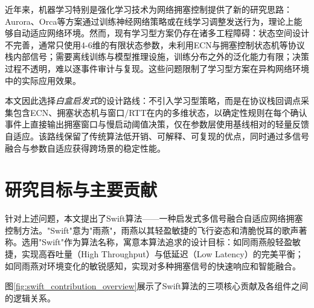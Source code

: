 近年来，机器学习特别是强化学习技术为网络拥塞控制提供了新的研究思路：Aurora、Orca等方案通过训练神经网络策略或在线学习调整发送行为，理论上能够自动适应网络环境。然而，现有学习型方案仍存在诸多工程障碍：状态空间设计不完善，通常只使用4-6维的有限状态参数，未利用ECN与拥塞控制状态机等协议栈内部信号；需要离线训练与模型推理设施，训练分布之外的泛化能力有限；决策过程不透明，难以逐事件审计与复现。这些问题限制了学习型方案在异构网络环境中的实际应用效果。

本文因此选择\emph{白盒启发式}的设计路线：不引入学习型策略，而是在协议栈回调点采集包含ECN、拥塞状态机与窗口/RTT在内的多维状态，以确定性规则在每个确认事件上直接输出拥塞窗口与慢启动阈值决策，仅在参数层使用基线相对的轻量反馈自适应。该路线保留了传统算法低开销、可解释、可复现的优点，同时通过多信号融合与参数自适应获得跨场景的稳定性能。

\section{研究目标与主要贡献}

针对上述问题，本文提出了Swift算法——一种启发式多信号融合自适应网络拥塞控制方法。"Swift"意为"雨燕"，雨燕以其轻盈敏捷的飞行姿态和清脆悦耳的歌声著称。选用"Swift"作为算法名称，寓意本算法追求的设计目标：如同雨燕般轻盈敏捷，实现高吞吐量（High Throughput）与低延迟（Low Latency）的完美平衡；如同雨燕对环境变化的敏锐感知，实现对多种拥塞信号的快速响应和智能融合。

图\ref{fig:swift_contribution_overview}展示了Swift算法的三项核心贡献及各组件之间的逻辑关系。

